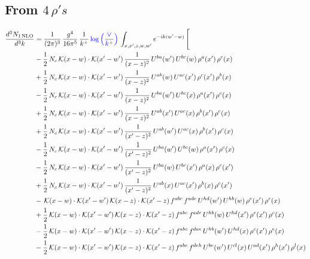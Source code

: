 \documentclass[9pt]{article}
\numberwithin{equation}{section}
\begin{document}
\subsection{From $4\, \rho's$}
\begin{align}
\frac{d^{3}N_{1\,\mathrm{NLO}}}{d^{3}k} & = \frac{1}{(2\pi)^{3}}\,\frac{g^{4}}{16\pi^{5}}\,\frac{1}{k^{+}}\,{\color{blue}\log{\left(\frac{\vee}{k^{+}}\right)}}\,\int_{x,x',z,w,w'}e^{-ik(w'-w)}\,\Bigg[\notag\\ & -\frac{1}{2}\,N_{c}\,\mathcal{K}(x-w)\cdot\mathcal{K}(x'-w')\,\frac{1}{(x-z)^{2}}\,U^{ba}(w')\,U^{bc}(w)\,\rho^{a}(x')\,\rho^{c}(x)\notag\\
& +\frac{1}{2}\,N_{c}\,\mathcal{K}(x-w)\cdot\mathcal{K}(x'-w')\,\frac{1}{(x-z)^{2}}\,U^{ab}(w)\,U^{ac}(x')\,\rho^{c}(x')\,\rho^{b}(x)\notag\\
& -\frac{1}{2}\,N_{c}\,\mathcal{K}(x-w)\cdot\mathcal{K}(x'-w')\,\frac{1}{(x-z)^{2}}\,U^{ba}(w')\,U^{bc}(x)\,\rho^{a}(x')\,\rho^{c}(x)\notag\\
& +\frac{1}{2}\,N_{c}\,\mathcal{K}(x-w)\cdot\mathcal{K}(x'-w')\,\frac{1}{(x-z)^{2}}\,U^{ab}(x')\,U^{ac}(x)\,\rho^{b}(x')\,\rho^{c}(x)\notag\\
& +\frac{1}{2}\,N_{c}\,\mathcal{K}(x-w)\cdot\mathcal{K}(x'-w')\,\frac{1}{(x'-z)^{2}}\,U^{ab}(w')\,U^{ac}(x)\,\rho^{b}(x')\,\rho^{c}(x)\notag\\
& -\frac{1}{2}\,N_{c}\,\mathcal{K}(x-w)\cdot\mathcal{K}(x'-w')\,\frac{1}{(x'-z)^{2}}\,U^{ba}(w')\,U^{bc}(w)\,\rho^{a}(x')\,\rho^{c}(x)\notag\\
& -\frac{1}{2}\,N_{c}\,\mathcal{K}(x-w)\cdot\mathcal{K}(x'-w')\,\frac{1}{(x'-z)^{2}}\,U^{ba}(w)\,U^{bc}(x')\,\rho^{a}(x)\,\rho^{c}(x')\notag\\
& +\frac{1}{2}\,N_{c}\,\mathcal{K}(x-w)\cdot\mathcal{K}(x'-w')\,\frac{1}{(x'-z)^{2}}\,U^{ab}(x)\,U^{ac}(x')\,\rho^{b}(x)\,\rho^{c}(x')\notag\\
& -\,\mathcal{K}(x-w)\cdot\mathcal{K}(x'-w')\,\mathcal{K}(x-z)\cdot\mathcal{K}(x'-z)\,f^{abc}\,f^{ade}\,U^{hd}(w')\,U^{hb}(w)\,\rho^{e}(x')\,\rho^{c}(x)\notag\\
& +\frac{1}{2}\,\mathcal{K}(x-w)\cdot\mathcal{K}(x'-w')\,\mathcal{K}(x-z)\cdot\mathcal{K}(x'-z)\,f^{abc}\,f^{ade}\,U^{hb}(w)\,U^{hd}(x')\,\rho^{e}(x')\,\rho^{c}(x)\notag\\
& -\frac{1}{2}\,\mathcal{K}(x-w)\cdot\mathcal{K}(x'-w')\,\mathcal{K}(x-z)\cdot\mathcal{K}(x'-z)\,f^{abc}\,f^{dae}\,U^{hb}(w')\,U^{hd}(x)\,\rho^{c}(x')\,\rho^{e}(x)\notag\\
& -\frac{1}{2}\,\mathcal{K}(x-w)\cdot\mathcal{K}(x'-w')\,\mathcal{K}(x-z)\cdot\mathcal{K}(x'-z)\,f^{abc}\,f^{deh}\,U^{be}(w')\,U^{cl}(x)\,U^{ad}(x')\,\rho^{h}(x')\,\rho^{l}(x)\notag\\

\end{align}
\end{document}

